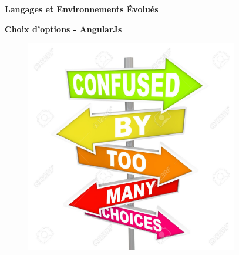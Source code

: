 \documentclass[12pt]{article}
\begin{document}
\vspace{\baselineskip}

\vspace{\baselineskip}
\begin{Center}
{\fontsize{28pt}{33.6pt}\selectfont \textbf{Langages et Environnements Évolués}\par}
\end{Center}\par

\begin{Center}
{\fontsize{24pt}{28.8pt}\selectfont \textbf{Choix d’options - AngularJs}\par}
\end{Center}\par


\vspace{\baselineskip}

\vspace{\baselineskip}



\begin{figure}[H]
	\begin{Center}
		\includegraphics[width=3.66in,height=3.68in]{./media/image1.jpeg}
	\end{Center}
\end{figure}



\par


\vspace{\baselineskip}
\end{document}
